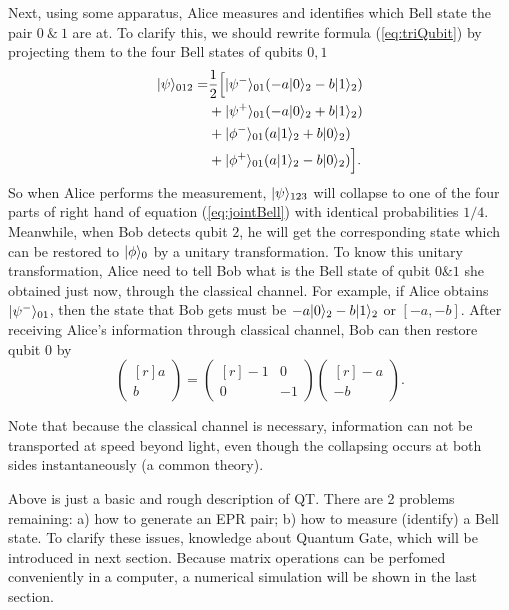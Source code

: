 	Next, using some apparatus, Alice
	measures and identifies which Bell state the pair $0\  \&\  1$ are at. To clarify this, 
	we should rewrite formula (\ref{eq:triQubit}) by projecting them to the four Bell states of qubits $0,1$ 
	\begin{equation}
	\label{eq:jointBell}
		\begin{aligned}
		|{\psi} \rangle_{012} = &\frac{1}{2} \Bigl[ |{\psi^-} \rangle_{01}(-a |{0} \rangle_2 - b |{1} \rangle_2 )\\
						 &+ |{\psi^+} \rangle_{01} (-a |{0} \rangle_2 +b |{1} \rangle_2)\\
						 &+ |{\phi^-} \rangle_{01} (a |{1} \rangle_2 + b |{0} \rangle_2)\\
						 &+ |{\phi^+} \rangle_{01} (a|{1} \rangle_2 -b |{0} \rangle_2) \Bigr].
		\end{aligned}
	\end{equation}
	So when Alice performs the measurement, $|{\psi} \rangle_{123}$ will collapse to one of the four parts 
	of right hand of equation (\ref{eq:jointBell}) with identical probabilities $1/4$.
	Meanwhile, when Bob detects qubit $2$, he will get the corresponding state 
	which can be restored to $|{\phi} \rangle_0$ by a unitary transformation. 
	To know this unitary transformation, Alice need to 
	tell Bob what is the Bell state of qubit $0 \& 1$ she obtained just now, 
	through the classical channel. For example, if Alice obtains $|{\psi^-} \rangle_{01}$, 
	then the state that Bob gets must be $-a |{0} \rangle_2 - b |{1} \rangle_2$ or $[-a, -b]$.
	After receiving Alice's information through classical channel, Bob can then restore qubit $0$ by
	\begin{equation}
	 \begin{pmatrix*}[r] a\\b \end{pmatrix*} =\begin{pmatrix*}[r] -1 &  0 \\ 0 & -1 \end{pmatrix*}
	 \begin{pmatrix*}[r] -a\\-b \end{pmatrix*}.
	\end{equation}

	Note that because the classical channel is necessary, information can not be transported at speed
	beyond light, even though the collapsing occurs at both sides instantaneously (a common theory).

	Above is just a basic and rough description of QT. There are 2 problems remaining: 
	a) how to generate an EPR pair; b) how to measure (identify) a Bell state. 
	To clarify these issues, knowledge about Quantum Gate, which will be introduced in next section.
	Because matrix operations can be perfomed conveniently in a computer, 
	a numerical simulation will be shown in the last section.

